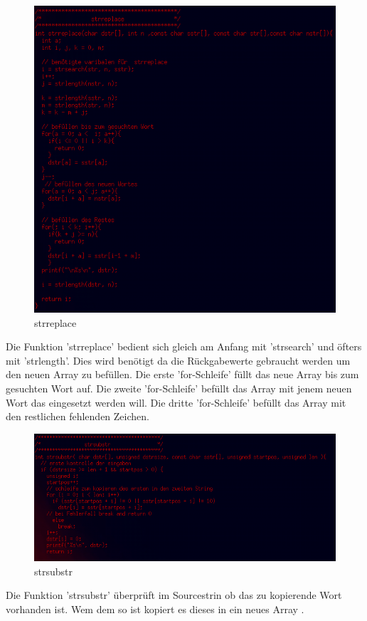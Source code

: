 \documentclass{scrartcl}
\begin{document}
\begin{figure}[H]
  \centering
  \includegraphics[width=0.9\linewidth]{images/strreplace.png}
  \caption{strreplace}
  \label{fig:digraph}
\end{figure}
Die Funktion 'strreplace' bedient sich gleich am Anfang mit 'strsearch' und öfters mit 'strlength'. Dies wird benötigt da die Rückgabewerte gebraucht werden um den neuen Array zu befüllen. Die erste 'for-Schleife' füllt das neue Array bis zum gesuchten Wort auf. Die zweite 'for-Schleife' befüllt das Array mit jenem neuen Wort das eingesetzt werden will. Die dritte 'for-Schleife' befüllt das Array mit den restlichen fehlenden Zeichen.

\begin{figure}[H]
  \centering
  \includegraphics[width=0.9\linewidth]{images/strsubstr.png}
  \caption{strsubstr}
  \label{fig:digraph}
\end{figure}
Die Funktion 'strsubstr' überprüft im Sourcestrin ob das zu kopierende Wort vorhanden ist. Wem dem so ist kopiert es dieses in ein neues Array .
\newpage
\end{document}
